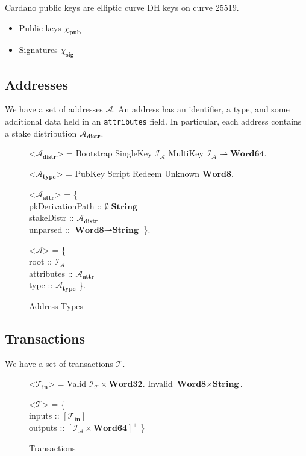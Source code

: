 \documentclass{article}
\def\fld{\\\llap{,\quad}}%
\newcommand{\rhu}{\rightharpoonup}
\newcommand{\lists}[1]{\left[{#1}\right]}
\newcommand{\nelists}[1]{\left[{#1}\right]^+}
\newcommand{\maybe}[1]{\emptyset | {#1}}
\newcommand{\idsof}[1]{\mathcal{I}\!_#1}
\newcommand{\txids}{\idsof{\txs}}
\newcommand{\agentids}{\idsof{\agents}}
\newcommand{\pubkey}{\chi_{\textbf{pub}}}
\newcommand{\signature}{\chi_{\textbf{sig}}}
\newcommand{\agents}{\mathcal{A}}
\newcommand{\txs}{\mathcal{T}}
\newcommand{\txins}{\txs_{\textbf{in}}}
\newcommand{\hstype}[1]{\textbf{#1}}
\newcommand{\String}{\hstype{String}}
\newcommand{\Word}[1]{\hstype{Word#1}}
\begin{document}
Cardano public keys are elliptic curve DH keys on curve 25519.

\begin{itemize}
\item Public keys $\pubkey$
\item Signatures $\signature$
\end{itemize}

\subsection{Addresses}

We have a set of addresses $\agents$. An address has an identifier, a type, and
some additional data held in an \verb|attributes| field. In particular, each
address contains a stake distribution $\agents_{\textbf{distr}}$.

\begin{figure}[H]
  \begin{grammar}
    <$\agents_{\textbf{distr}}$> = Bootstrap
      \alt SingleKey $\agentids$
      \alt MultiKey $\agentids \rhu \Word{64}$.

    <$\agents_{\textbf{type}}$> = PubKey \alt Script \alt Redeem \alt Unknown $\Word{8}$.

    <$\agents_{\textbf{attr}}$> = \{
    \fld pkDerivationPath :: $\maybe{\String}$
    \fld stakeDistr :: $\agents_{\textbf{distr}}$
    \fld unparsed :: $\Word{8}\rhu\String$
    \}.

    <$\agents$> = \{
    \fld root :: $\agentids$
    \fld attributes :: $\agents_{\textbf{attr}}$
    \fld type :: $\agents_{\textbf{type}}$
    \}.
  \end{grammar}

  \caption{Address Types}
\end{figure}

\subsection{Transactions}

We have a set of transactions $\txs$.

\begin{figure}[H]
  \caption{Transactions}
  \label{fig:txin}
  \begin{grammar}
    <$\txins$> = Valid $\txids\times\Word{32}$.
    \alt Invalid $\Word{8}\times\String$.

    <$\txs$> = \{
    \fld inputs :: $\lists{\txins}$
    \fld outputs :: $\nelists{\agentids \times \Word{64}}$
    \}
  \end{grammar}
\end{figure}
\end{document}

